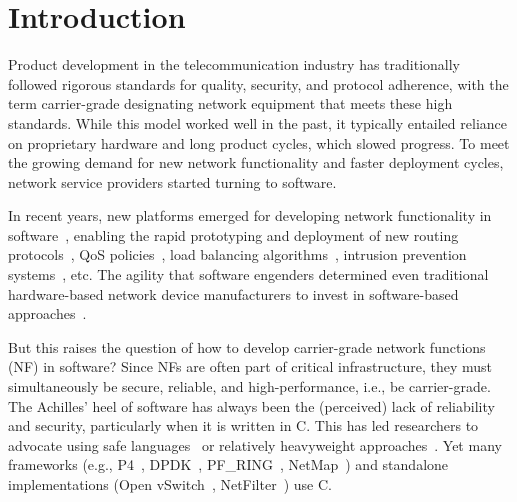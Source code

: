 \documentclass[letterpaper,twocolumn,10pt]{article}
\begin{document}
\section{Introduction}

Product development in the telecommunication industry has traditionally followed
rigorous standards for quality, security, and protocol adherence, with the term
carrier-grade designating network equipment that meets these high standards.
While this model worked well in the past, it typically entailed reliance on
proprietary hardware and long product cycles, which slowed progress. To meet the
growing demand for new network functionality and faster deployment cycles,
network service providers started turning to software.

In recent years, new platforms emerged for developing network functionality in
software~\cite{kohler2000click,bosshart2014p4,mccanne1993bsd,song2015unified,shah2003np,shahbaz2016pisces},
enabling the rapid prototyping and deployment of new routing
protocols~\cite{sivaraman2016packet}, QoS
policies~\cite{sivaraman2016programmable}, load balancing
algorithms~\cite{zhang2013steering}, intrusion prevention
systems~\cite{xing2014sdnips}, etc. The agility that software engenders
determined even traditional hardware-based network device manufacturers to
invest in software-based approaches~\cite{ciscodevelopssdn}.

But this raises the question of how to develop carrier-grade network functions
(NF) in software? Since NFs are often part of critical infrastructure, they must
simultaneously be secure, reliable, and high-performance, i.e., be
carrier-grade. The Achilles' heel of software has always been the (perceived)
lack of reliability and security, particularly when it is written in C. This has
led researchers to advocate using safe languages~\cite{clipsham2015safe,
  kourtis2015intelligent, fowler2014verified} or relatively heavyweight
approaches~\cite{madhavapeddy2007melange, madhavapeddy2005splat,
  musuvathi2004model, alur2001verifying, ennals2004linear, ridge2008rigorous,
  qadir2015applying}. Yet many frameworks (e.g., P4~\cite{bosshart2014p4},
DPDK~\cite{intel2014data}, PF\_RING~\cite{pfring},
NetMap~\cite{rizzo2012revisiting}) and standalone implementations (Open
vSwitch~\cite{pfaff2009extending}, NetFilter~\cite{boye2013netfilter}) use
C. %
\end{document}
